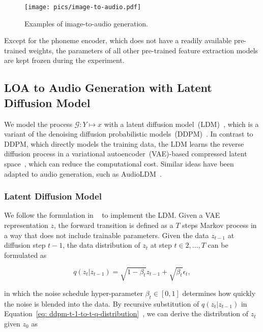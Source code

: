 \documentclass[lettersize,journal]{IEEEtran}
\begin{document}
\begin{figure}
    \centering
    \texttt{[image: pics/image-to-audio.pdf]}
    \caption{Examples of image-to-audio generation.}
    \label{fig: example-image-to-audio}
\end{figure}



Except for the phoneme encoder, which does not have a readily available pre-trained weights, the parameters of all other pre-trained feature extraction models are kept frozen during the experiment.

\subsection{LOA to Audio Generation with Latent Diffusion Model} 
\label{sec: latent-diffusion-model}

\noindent
We model the process $\mathcal{G}: Y \mapsto x$ with a latent diffusion model~(LDM)~\cite{rombach2022high-stablediffusion}, which is a variant of the denoising diffusion probabilistic models~(DDPM)~\cite{DDPM}. In contrast to DDPM, which directly models the training data, the LDM learns the reverse diffusion process in a variational autoencoder~(VAE)-based compressed latent space~\cite{kingma2013auto}, which can reduce the computational cost. Similar ideas have been adapted to audio generation, such as AudioLDM~\cite{liu2023audioldm}.

\subsubsection{Latent Diffusion Model}
\noindent
We follow the formulation in ~\cite{DDPM} to implement the LDM. Given a VAE representation $z$, the forward transition is defined as a $T$ steps Markov process in a way that does not include trainable parameters. Given the data $z_{t-1}$ at diffusion step $t-1$, the data distribution of $z_{t}$ at step $t\in{2,...,T}$ can be formulated as

\begin{equation}
    \label{eq: ddpm-t-1-to-t-q-distribution}
    q(z_{t}|z_{t-1})=\sqrt{1-\beta_{t}}z_{t-1}+\sqrt{\beta_{t}}\epsilon_{t}, 
\end{equation}

\noindent
in which the noise schedule hyper-parameter $\beta_{t}\in[0,1]$ determines how quickly the noise is blended into the data. By recursive substitution of $q(z_{t}|z_{t-1})$ in Equation~\eqref{eq: ddpm-t-1-to-t-q-distribution}~\cite{DDPM},  we can derive the distribution of $z_{t}$ given $z_0$ as
\end{document}
